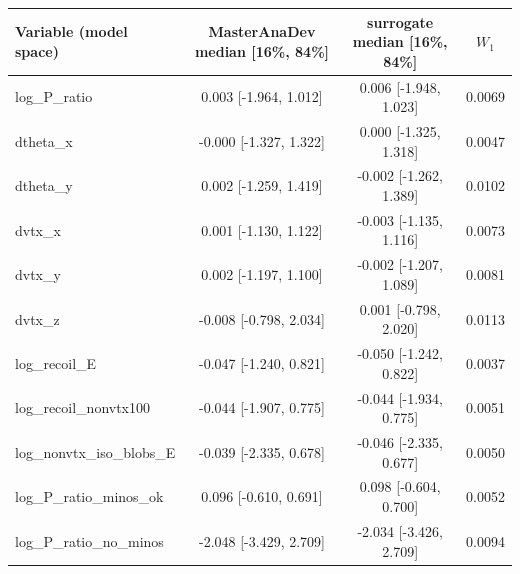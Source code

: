 \begin{tabular}{lccc}
\toprule
Variable (model space) & MasterAnaDev median [16\%, 84\%] & surrogate median [16\%, 84\%] & $W_1$ \\
\midrule
log\_P\_ratio & 0.003 [-1.964, 1.012] & 0.006 [-1.948, 1.023] & 0.0069 \\
dtheta\_x & -0.000 [-1.327, 1.322] & 0.000 [-1.325, 1.318] & 0.0047 \\
dtheta\_y & 0.002 [-1.259, 1.419] & -0.002 [-1.262, 1.389] & 0.0102 \\
dvtx\_x & 0.001 [-1.130, 1.122] & -0.003 [-1.135, 1.116] & 0.0073 \\
dvtx\_y & 0.002 [-1.197, 1.100] & -0.002 [-1.207, 1.089] & 0.0081 \\
dvtx\_z & -0.008 [-0.798, 2.034] & 0.001 [-0.798, 2.020] & 0.0113 \\
log\_recoil\_E & -0.047 [-1.240, 0.821] & -0.050 [-1.242, 0.822] & 0.0037 \\
log\_recoil\_nonvtx100 & -0.044 [-1.907, 0.775] & -0.044 [-1.934, 0.775] & 0.0051 \\
log\_nonvtx\_iso\_blobs\_E & -0.039 [-2.335, 0.678] & -0.046 [-2.335, 0.677] & 0.0050 \\
log\_P\_ratio\_minos\_ok & 0.096 [-0.610, 0.691] & 0.098 [-0.604, 0.700] & 0.0052 \\
log\_P\_ratio\_no\_minos & -2.048 [-3.429, 2.709] & -2.034 [-3.426, 2.709] & 0.0094 \\
\bottomrule
\end{tabular}
